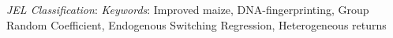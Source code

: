 \documentclass[11pt]{article}
\begin{document}
\begin{titlepage}
\begin{center}
\begin{abstract}
        \end{abstract}\end{center}
        
        {\small \noindent\emph{JEL Classification}:
        	\emph{Keywords}: Improved maize, DNA-fingerprinting, Group Random Coefficient, Endogenous Switching Regression, Heterogeneous returns}

    \end{titlepage}
\maketitle
\newpage


\end{document}
